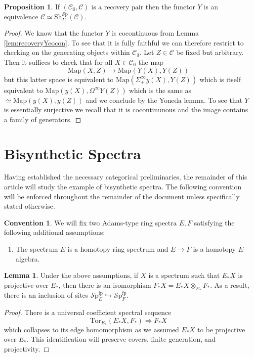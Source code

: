 \documentclass[10pt]{amsart}
\theoremstyle{definition}
\numberwithin{figure}{section}
\numberwithin{equation}{section}
\newtheorem{lemma}[figure]{Lemma}
\newtheorem{proposition}[figure]{Proposition}
\newtheorem{convention}[figure]{Convention}
\newcommand{\cC}{\mathcal{C}}
\theoremstyle{cited}
\newcommand{\Sp}{{\mathcal{S}\mathrm{p}}}
\newcommand{\Map}{\mathrm{Map}}
\newcommand{\Sh}{\mathrm{Sh}}
\newcommand{\fp}{\mathrm{fp}}
\newcommand{\Tor}{\mathrm{Tor}}
\begin{document}
\begin{proposition}\label{prop:recpairrecovers}
  If $(\cC_0,\cC)$ is a recovery pair then the functor $Y$ is an equivalence $\cC\simeq \Sh_\Sigma^\Sp(\cC)$.
\end{proposition}

\begin{proof}
  We know that the functor $Y$ is cocontinuous from Lemma \ref{lem:recoveryYcocon}. To see that it is fully faithful we can therefore restrict to checking on the generating objects within $\cC_0$. Let $Z\in \cC$ be fixed but arbitrary. Then it suffices to check that for all $X\in \cC_0$ the map
  \[
    \Map(X,Z)\to \Map(Y(X),Y(Z))
  \]
  but this latter space is equivalent to $\Map(\Sigma_+^\infty y(X), Y(Z))$ which is itself equivalent to $\Map(y(X), \Omega^\infty Y(Z))$ which is the same as $\simeq\Map(y(X),y(Z))$ and we conclude by the Yoneda lemma. To see that $Y$ is essentially surjective we recall that it is cocontinunous and the image contains a family of generators.
\end{proof} 


\section{Bisynthetic Spectra}

Having established the necessary categorical preliminaries, the remainder of this article will study the example of bisynthetic spectra. The following convention will be enforced throughout the remainder of the document unless specifically stated otherwise. 

\begin{convention}\label{conv:eandf}
  We will fix two Adams-type ring spectra $E,F$ satisfying the following additional assumptions:
  \begin{enumerate}
      \item The spectrum $E$ is a homotopy ring spectrum and $E\to F$ is a homotopy $E$-algebra.
  \end{enumerate}
\end{convention}

\begin{lemma}
  Under the above assumptions, if $X$ is a spectrum such that $E_*X$ is projective over $E_*$, then there is an isomorphism $F_*X=E_*X\otimes_{E_*}F_*$. As a result, there is an inclusion of sites $\Sp^\fp_E\hookrightarrow \Sp^\fp_F$.
\end{lemma}

\begin{proof}
  There is a universal coefficient spectral sequence
  \[
    \Tor_{E_*}(E_*X, F_*)\Rightarrow F_*X
  \]
  which collapses to its edge homomorphism as we assumed $E_*X$ to be projective over $E_*$. This identification will preserve covers, finite generation, and projectivity.
\end{proof}
\end{document}
